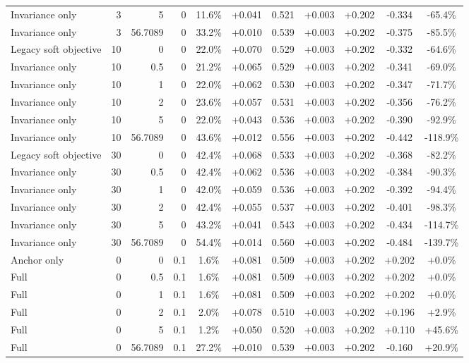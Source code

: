 \begin{table}[htbp]
\begin{tabular}{lrrrccccccc}
Invariance only & 3 & 5 & 0 & 11.6\% & +0.041 & 0.521 & +0.003 & +0.202 & -0.334 & -65.4\% \\
Invariance only & 3 & 56.7089 & 0 & 33.2\% & +0.010 & 0.539 & +0.003 & +0.202 & -0.375 & -85.5\% \\
Legacy soft objective & 10 & 0 & 0 & 22.0\% & +0.070 & 0.529 & +0.003 & +0.202 & -0.332 & -64.6\% \\
Invariance only & 10 & 0.5 & 0 & 21.2\% & +0.065 & 0.529 & +0.003 & +0.202 & -0.341 & -69.0\% \\
Invariance only & 10 & 1 & 0 & 22.0\% & +0.062 & 0.530 & +0.003 & +0.202 & -0.347 & -71.7\% \\
Invariance only & 10 & 2 & 0 & 23.6\% & +0.057 & 0.531 & +0.003 & +0.202 & -0.356 & -76.2\% \\
Invariance only & 10 & 5 & 0 & 22.0\% & +0.043 & 0.536 & +0.003 & +0.202 & -0.390 & -92.9\% \\
Invariance only & 10 & 56.7089 & 0 & 43.6\% & +0.012 & 0.556 & +0.003 & +0.202 & -0.442 & -118.9\% \\
Legacy soft objective & 30 & 0 & 0 & 42.4\% & +0.068 & 0.533 & +0.003 & +0.202 & -0.368 & -82.2\% \\
Invariance only & 30 & 0.5 & 0 & 42.4\% & +0.062 & 0.536 & +0.003 & +0.202 & -0.384 & -90.3\% \\
Invariance only & 30 & 1 & 0 & 42.0\% & +0.059 & 0.536 & +0.003 & +0.202 & -0.392 & -94.4\% \\
Invariance only & 30 & 2 & 0 & 42.4\% & +0.055 & 0.537 & +0.003 & +0.202 & -0.401 & -98.3\% \\
Invariance only & 30 & 5 & 0 & 43.2\% & +0.041 & 0.543 & +0.003 & +0.202 & -0.434 & -114.7\% \\
Invariance only & 30 & 56.7089 & 0 & 54.4\% & +0.014 & 0.560 & +0.003 & +0.202 & -0.484 & -139.7\% \\
Anchor only & 0 & 0 & 0.1 & 1.6\% & +0.081 & 0.509 & +0.003 & +0.202 & +0.202 & +0.0\% \\
Full & 0 & 0.5 & 0.1 & 1.6\% & +0.081 & 0.509 & +0.003 & +0.202 & +0.202 & +0.0\% \\
Full & 0 & 1 & 0.1 & 1.6\% & +0.081 & 0.509 & +0.003 & +0.202 & +0.202 & +0.0\% \\
Full & 0 & 2 & 0.1 & 2.0\% & +0.078 & 0.510 & +0.003 & +0.202 & +0.196 & +2.9\% \\
Full & 0 & 5 & 0.1 & 1.2\% & +0.050 & 0.520 & +0.003 & +0.202 & +0.110 & +45.6\% \\
Full & 0 & 56.7089 & 0.1 & 27.2\% & +0.010 & 0.539 & +0.003 & +0.202 & -0.160 & +20.9\% \\

\end{tabular}
\end{table}
